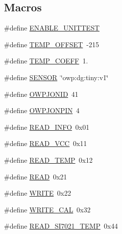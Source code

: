 \subsection*{Macros}
\begin{DoxyCompactItemize}
\item 
\#define \hyperlink{OWP__DG__Si7021__thermo-hygrometer_8ino_a133432ca7ece04b33429e0fb94544867}{E\-N\-A\-B\-L\-E\-\_\-\-U\-N\-I\-T\-T\-E\-S\-T}
\item 
\#define \hyperlink{OWP__DG__Si7021__thermo-hygrometer_8ino_a3cb24f09004f92185b77e9e7bac6ea61}{T\-E\-M\-P\-\_\-\-O\-F\-F\-S\-E\-T}~-\/215
\item 
\#define \hyperlink{OWP__DG__Si7021__thermo-hygrometer_8ino_ab667d793bed5c1fb5503624b0ab7504a}{T\-E\-M\-P\-\_\-\-C\-O\-E\-F\-F}~1.
\item 
\#define \hyperlink{OWP__DG__Si7021__thermo-hygrometer_8ino_a84f1ead330bbcc83a63929c4726080d7}{S\-E\-N\-S\-O\-R}~\char`\"{}owp\-:dg\-:tiny\-:v1\char`\"{}
\item 
\#define \hyperlink{OWP__DG__Si7021__thermo-hygrometer_8ino_aff6283040066cbe0e6d17cbcd83abffc}{O\-W\-P\-J\-O\-N\-I\-D}~41
\item 
\#define \hyperlink{OWP__DG__Si7021__thermo-hygrometer_8ino_a56e661b1bfea8fcdd1bc25c6cdfe2a73}{O\-W\-P\-J\-O\-N\-P\-I\-N}~4
\item 
\#define \hyperlink{OWP__DG__Si7021__thermo-hygrometer_8ino_ae9d85efda88bdfdba5ca9fe92f557dd9}{R\-E\-A\-D\-\_\-\-I\-N\-F\-O}~0x01
\item 
\#define \hyperlink{OWP__DG__Si7021__thermo-hygrometer_8ino_a3563b296d5f60635a1256e8a12261d74}{R\-E\-A\-D\-\_\-\-V\-C\-C}~0x11
\item 
\#define \hyperlink{OWP__DG__Si7021__thermo-hygrometer_8ino_ac8c23082885adeec4834469b64e00bb9}{R\-E\-A\-D\-\_\-\-T\-E\-M\-P}~0x12
\item 
\#define \hyperlink{OWP__DG__Si7021__thermo-hygrometer_8ino_ada74e7db007a68e763f20c17f2985356}{R\-E\-A\-D}~0x21
\item 
\#define \hyperlink{OWP__DG__Si7021__thermo-hygrometer_8ino_aa10f470e996d0f51210d24f442d25e1e}{W\-R\-I\-T\-E}~0x22
\item 
\#define \hyperlink{OWP__DG__Si7021__thermo-hygrometer_8ino_a9418b096dba157494f523dc01b82a760}{W\-R\-I\-T\-E\-\_\-\-C\-A\-L}~0x32
\item 
\#define \hyperlink{OWP__DG__Si7021__thermo-hygrometer_8ino_af0d74f2cbceca03099cafeac2a906070}{R\-E\-A\-D\-\_\-\-S\-I7021\-\_\-\-T\-E\-M\-P}~0x44
\item 

\end{DoxyCompactItemize}
